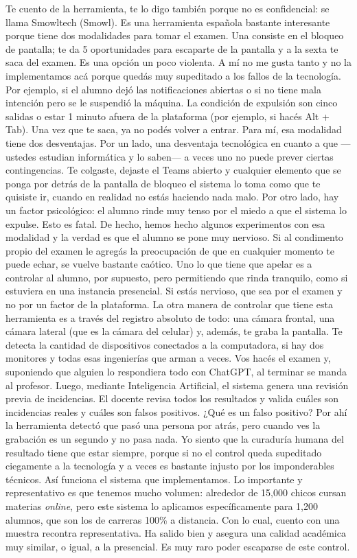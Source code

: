 \begin{description}[leftmargin=0cm, labelsep=0.5cm, style=nextline]
\item[\textbf{Entrevistado:}] Te cuento de la herramienta, te lo digo también porque no es confidencial: se llama Smowltech (Smowl). Es una herramienta española bastante interesante porque tiene dos modalidades para tomar el examen. Una consiste en el bloqueo de pantalla; te da 5 oportunidades para escaparte de la pantalla y a la sexta te saca del examen. Es una opción un poco violenta. A mí no me gusta tanto y no la implementamos acá porque quedás muy supeditado a los fallos de la tecnología. Por ejemplo, si el alumno dejó las notificaciones abiertas o si no tiene mala intención pero se le suspendió la máquina. La condición de expulsión son cinco salidas o estar 1 minuto afuera de la plataforma (por ejemplo, si hacés Alt + Tab). Una vez que te saca, ya no podés volver a entrar. Para mí, esa modalidad tiene dos desventajas. Por un lado, una desventaja tecnológica en cuanto a que ---ustedes estudian informática y lo saben--- a veces uno no puede prever ciertas contingencias. Te colgaste, dejaste el Teams abierto y cualquier elemento que se ponga por detrás de la pantalla de bloqueo el sistema lo toma como que te quisiste ir, cuando en realidad no estás haciendo nada malo. Por otro lado, hay un factor psicológico: el alumno rinde muy tenso por el miedo a que el sistema lo expulse. Esto es fatal. De hecho, hemos hecho algunos experimentos con esa modalidad y la verdad es que el alumno se pone muy nervioso. Si al condimento propio del examen le agregás la preocupación de que en cualquier momento te puede echar, se vuelve bastante caótico. Uno lo que tiene que apelar es a controlar al alumno, por supuesto, pero permitiendo que rinda tranquilo, como si estuviera en una instancia presencial. Si estás nervioso, que sea por el examen y no por un factor de la plataforma. La otra manera de controlar que tiene esta herramienta es a través del registro absoluto de todo: una cámara frontal, una cámara lateral (que es la cámara del celular) y, además, te graba la pantalla. Te detecta la cantidad de dispositivos conectados a la computadora, si hay dos monitores y todas esas ingenierías que arman a veces. Vos hacés el examen y, suponiendo que alguien lo respondiera todo con ChatGPT, al terminar se manda al profesor. Luego, mediante Inteligencia Artificial, el sistema genera una revisión previa de incidencias. El docente revisa todos los resultados y valida cuáles son incidencias reales y cuáles son falsos positivos. ¿Qué es un falso positivo? Por ahí la herramienta detectó que pasó una persona por atrás, pero cuando ves la grabación es un segundo y no pasa nada. Yo siento que la curaduría humana del resultado tiene que estar siempre, porque si no el control queda supeditado ciegamente a la tecnología y a veces es bastante injusto por los imponderables técnicos. Así funciona el sistema que implementamos. Lo importante y representativo es que tenemos mucho volumen: alrededor de 15,000 chicos cursan materias \textit{online}, pero este sistema lo aplicamos específicamente para 1,200 alumnos, que son los de carreras 100\% a distancia. Con lo cual, cuento con una muestra recontra representativa. Ha salido bien y asegura una calidad académica muy similar, o igual, a la presencial. Es muy raro poder escaparse de este control.

\end{description}
